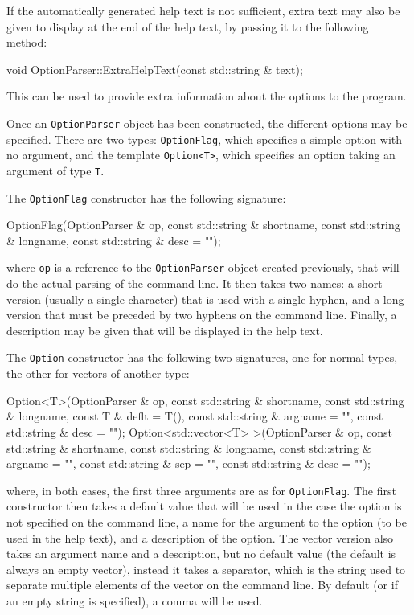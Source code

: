 If the automatically generated help text is not sufficient,
extra text may also be given to display at the end of the help text,
by passing it to the following method:
\begin{listing}
void OptionParser::ExtraHelpText(const std::string & text);
\end{listing}
This can be used to provide extra information about the options to the program.

Once an \texttt{OptionParser} object has been constructed, the different options may be specified.
There are two types: \texttt{OptionFlag}, which specifies a simple option with no argument,
and the template \texttt{Option<T>}, which specifies an option taking an argument of type \texttt{T}.

The \texttt{OptionFlag} constructor has the following signature:
\begin{listing}
OptionFlag(OptionParser & op, const std::string & shortname,
           const std::string & longname, const std::string & desc = "");
\end{listing}
where \texttt{op} is a reference to the \texttt{OptionParser} object created previously,
that will do the actual parsing of the command line.
It then takes two names: a short version (usually a single character) that is used with a single hyphen,
and a long version that must be preceded by two hyphens on the command line.
Finally, a description may be given that will be displayed in the help text.

The \texttt{Option} constructor has the following two signatures,
one for normal types, the other for vectors of another type:
\begin{listing}
Option<T>(OptionParser & op, const std::string & shortname,
          const std::string & longname, const T & deflt = T(),
          const std::string & argname = "", const std::string & desc = "");
Option<std::vector<T> >(OptionParser & op, const std::string & shortname,
          const std::string & longname, const std::string & argname = "",
          const std::string & sep = "", const std::string & desc = "");
\end{listing}
where, in both cases, the first three arguments are as for \texttt{OptionFlag}.
The first constructor then takes a default value that will be used
in the case the option is not specified on the command line,
a name for the argument to the option (to be used in the help text),
and a description of the option.
The vector version also takes an argument name and a description,
but no default value (the default is always an empty vector), instead it takes a separator,
which is the string used to separate multiple elements of the vector on the command line.
By default (or if an empty string is specified), a comma will be used.

